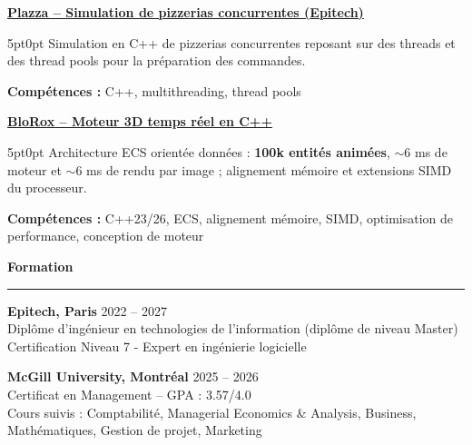 \documentclass[9pt]{extarticle}
\begin{document}
\par\vspace{8pt}

\underline{\bfseries Plazza -- Simulation de pizzerias concurrentes (Epitech)}
\par
\begin{adjustwidth}{5pt}{0pt}
    Simulation en C++ de pizzerias concurrentes reposant sur des threads et des thread pools pour la préparation des commandes.
\end{adjustwidth}
\par
{\bfseries Compétences :} C++, multithreading, thread pools

\par\vspace{8pt}

\underline{\bfseries \href{https://github.com/paulogarithm/blorox}{BloRox} -- Moteur 3D temps réel en C++}
\par
\begin{adjustwidth}{5pt}{0pt}
	Architecture ECS orientée données : {\bfseries 100k entités animées}, $\sim$6 ms de moteur et $\sim$6 ms de rendu par image ; alignement mémoire et extensions SIMD du processeur.
\end{adjustwidth}
\par
{\bfseries Compétences :} C++23/26, ECS, alignement mémoire, SIMD, optimisation de performance, conception de moteur

\par\vspace{8pt}

{\large\bfseries Formation}
\par\vspace{-8pt}
\rule{\linewidth}{0.4pt}
\par\vspace{5pt}

{\bfseries Epitech, Paris} \hfill 2022 -- 2027 \\
Diplôme d'ingénieur en technologies de l'information (diplôme de niveau Master) \\
Certification Niveau 7 - Expert en ingénierie logicielle

\vspace{6pt}

{\bfseries McGill University, Montréal} \hfill 2025 -- 2026 \\
Certificat en Management -- GPA : 3.57/4.0 \\
Cours suivis : Comptabilité, Managerial Economics \& Analysis, Business, Mathématiques, Gestion de projet, Marketing
\end{document}
